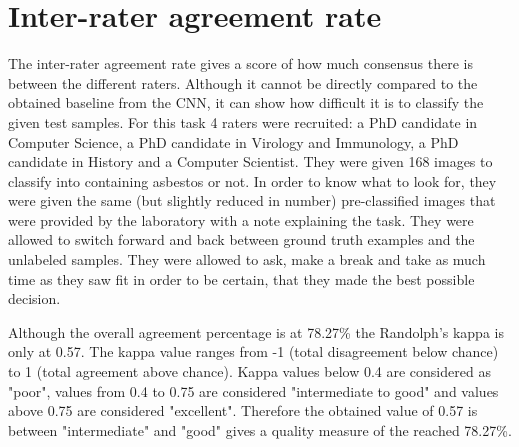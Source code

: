\section{Inter-rater agreement rate}

The inter-rater agreement rate gives a score of how much consensus there is between the different raters. Although it cannot be directly compared to the obtained baseline from the CNN, it can show how difficult it is to classify the given test samples. For this task 4 raters were recruited: a PhD candidate in Computer Science, a PhD candidate in Virology and Immunology, a PhD candidate in History and a Computer Scientist. They were given 168 images to classify into containing asbestos or not. In order to know what to look for, they were given the same (but slightly reduced in number) pre-classified images that were provided by the laboratory with a note explaining the task. They were allowed to switch forward and back between ground truth examples and the unlabeled samples. They were allowed to ask, make a break and take as much time as they saw fit in order to be certain, that they made the best possible decision.\\


\begin{table}[!h] \centering
{}
\caption{Inter-rater agreement rate (Randolph's kappa) of 4 annotators.}
\label{tbl:interagreement}
\end{table}

\quad

Although the overall agreement percentage is at 78.27\% the Randolph's kappa is only at 0.57. The kappa value ranges from -1 (total disagreement below chance) to 1 (total agreement above chance). Kappa values below 0.4 are considered as "poor", values from 0.4 to 0.75  are considered "intermediate to good" and values  above 0.75 are considered "excellent". Therefore the obtained value of 0.57 is between "intermediate" and "good" gives a quality measure of the reached 78.27\%. \\











